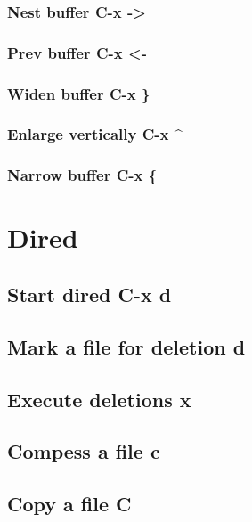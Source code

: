 \documentclass[11pt]{article}
\begin{document}
\subsubsection{Nest buffer C-x ->}
\label{sec:org59a2ca5}

\subsubsection{Prev buffer C-x <-}
\label{sec:org5c96886}

\subsubsection{Widen buffer C-x \}}
\label{sec:org28efcf9}

\subsubsection{Enlarge vertically C-x \^{}}
\label{sec:org29d0bd1}

\subsubsection{Narrow buffer C-x \{}
\label{sec:org8a3cddc}

\section{Dired}
\label{sec:org23734ae}

\subsection{Start dired  C-x d}
\label{sec:org1e5b8c1}

\subsection{Mark a file for deletion d}
\label{sec:orgb35d8aa}

\subsection{Execute deletions x}
\label{sec:org098c954}

\subsection{Compess a file c}
\label{sec:org3cdd2fd}

\subsection{Copy a file C}
\label{sec:orge1e99ef}
\end{document}
